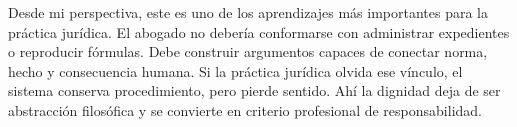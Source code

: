 \documentclass[
	spanish,
	letterpaper, oneside
]{article}
\begin{document}
Desde mi perspectiva, este es uno de los aprendizajes más importantes para la práctica jurídica. El abogado no debería conformarse con administrar expedientes o reproducir fórmulas. Debe construir argumentos capaces de conectar norma, hecho y consecuencia humana. Si la práctica jurídica olvida ese vínculo, el sistema conserva procedimiento, pero pierde sentido. Ahí la dignidad deja de ser abstracción filosófica y se convierte en criterio profesional de responsabilidad.
%
%
%
%
%
%
\end{document}
